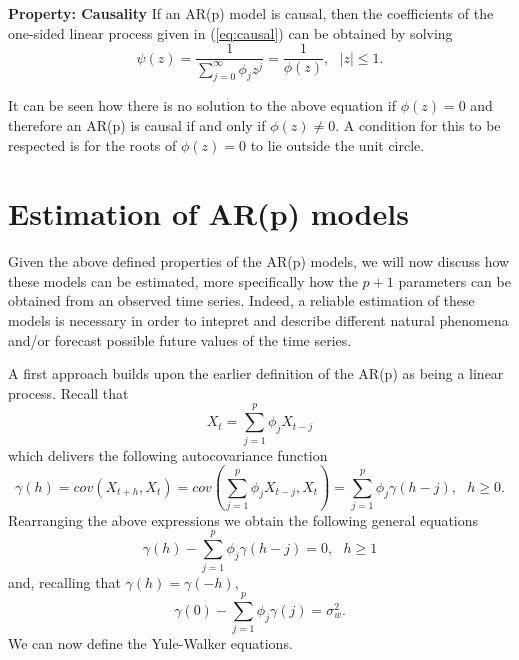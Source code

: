 \documentclass[]{book}
\theoremstyle{definition}
\theoremstyle{definition}
\theoremstyle{definition}
\theoremstyle{remark}
\begin{document}
{\textbf{Property: Causality} If an AR(p) model is causal, then the
coefficients of the one-sided linear process given in (\eqref{eq:causal})
can be obtained by solving \begin{equation*}
    \psi(z) = \frac{1}{\sum_{j=0}^{\infty} \phi_j z^j} = \frac{1}{\phi(z)}, \mbox{ } |z| \leq 1.
\end{equation*}

It can be seen how there is no solution to the above equation if
\(\phi(z) = 0\) and therefore an AR(p) is causal if and only if
\(\phi(z) \neq 0\). A condition for this to be respected is for the
roots of \(\phi(z) = 0\) to lie outside the unit circle.

\hypertarget{estimation-of-arp-models}{%
\section{Estimation of AR(p) models}\label{estimation-of-arp-models}}

Given the above defined properties of the AR(p) models, we will now
discuss how these models can be estimated, more specifically how the
\(p+1\) parameters can be obtained from an observed time series. Indeed,
a reliable estimation of these models is necessary in order to intepret
and describe different natural phenomena and/or forecast possible future
values of the time series.

A first approach builds upon the earlier definition of the AR(p) as
being a linear process. Recall that \begin{equation}
    X_t = \sum_{j = 1}^{p} \phi_j X_{t-j}
\end{equation} which delivers the following autocovariance function
\begin{equation}
    \gamma(h) = cov(X_{t+h}, X_t) = cov(\sum_{j = 1}^{p} \phi_j X_{t-j}, X_t) = \sum_{j = 1}^{p} \phi_j \gamma(h-j), \mbox{ } h \geq 0.
\end{equation} Rearranging the above expressions we obtain the following
general equations \begin{equation}
    \gamma(h) - \sum_{j = 1}^{p} \phi_j \gamma(h-j) = 0, \mbox{ } h \geq 1
\end{equation} and, recalling that \(\gamma(h) = \gamma(-h)\),
\begin{equation}
    \gamma(0) - \sum_{j = 1}^{p} \phi_j \gamma(j) = \sigma_w^2.
\end{equation} We can now define the Yule-Walker equations.

}
\end{document}
